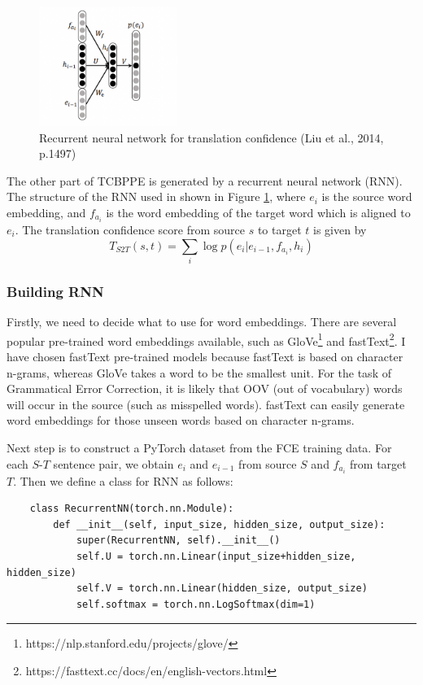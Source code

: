 \documentclass[12pt,a4paper,twoside,openright]{report}
\begin{document}
\begin{figure}[ht]
\centering
\includegraphics[width=0.4\textwidth]{images/rnn_ppe.png}
\caption{Recurrent neural network for translation confidence (Liu et al., 2014, p.1497)}
\label{fig:rnn_ppe}
\end{figure}

The other part of TCBPPE is generated by a recurrent neural network (RNN). The structure of the RNN used in shown in Figure \ref{fig:rnn_ppe}, where $e_i$ is the source word embedding, and $f_{a_i}$ is the word embedding of the target word which is aligned to $e_i$. The translation confidence score from source $s$ to target $t$ is given by
\[ T_{S2T}(s, t) = \sum_{i} \log p(e_i|e_{i-1}, f_{a_i}, h_i)\]

\subsubsection{Building RNN}
Firstly, we need to decide what to use for word embeddings. There are several popular pre-trained word embeddings available, such as GloVe\footnote{https://nlp.stanford.edu/projects/glove/} and fastText\footnote{https://fasttext.cc/docs/en/english-vectors.html}. I have chosen fastText pre-trained models because fastText is based on character n-grams, whereas GloVe takes a word to be the smallest unit. For the task of Grammatical Error Correction, it is likely that OOV (out of vocabulary) words will occur in the source (such as misspelled words). fastText can easily generate word embeddings for those unseen words based on character n-grams.

Next step is to construct a PyTorch dataset from the FCE training data. For each $S\textrm{-}T$ sentence pair, we obtain $e_i$ and $e_{i-1}$ from source $S$ and $f_{a_i}$ from target $T$. Then we define a class for RNN as follows:

\begin{verbatim}
    class RecurrentNN(torch.nn.Module):
        def __init__(self, input_size, hidden_size, output_size):
            super(RecurrentNN, self).__init__()
            self.U = torch.nn.Linear(input_size+hidden_size, hidden_size)
            self.V = torch.nn.Linear(hidden_size, output_size)
            self.softmax = torch.nn.LogSoftmax(dim=1)
\end{verbatim}
\end{document}
